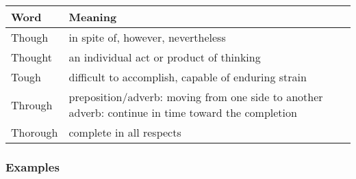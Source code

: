 \documentclass[a4paper,12pt]{report}
\begin{document}
\begin{center}
  \begin{tabular}{| m{3cm} || m{12cm} | }
    \hline
    Word     & Meaning                                                                                                     \\
    \hline
    \hline
    Though   & in spite of, however, nevertheless                                                                          \\
    \hline
    Thought  & an individual act or product of thinking                                                                    \\
    \hline
    Tough    & difficult to accomplish, capable of enduring strain                                                         \\
    \hline
    Through  & preposition/adverb: moving from one side to another \newline adverb: continue in time toward the completion \\
    \hline
    Thorough & complete in all respects                                                                                    \\
    \hline
  \end{tabular}
\end{center}

\subsubsection{Examples}
\end{document}
